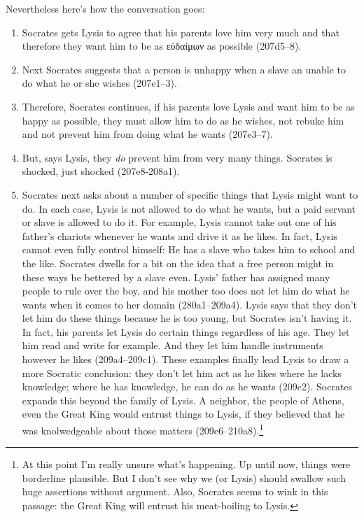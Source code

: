 \documentclass[11pt]{article}
\begin{document}
Nevertheless here's how the conversation goes:

\begin{enumerate}
    \item Socrates gets Lysis to agree that his parents love him very much and that therefore they want him to be as εὐδαίμων as possible (207d5--8).
    \item Next Socrates suggests that a person is unhappy when a slave an unable to do what he or she wishes (207e1--3).
    \item Therefore, Socrates continues, if his parents love Lysis and want him to be as happy as possible, they must allow him to do as he wishes, not rebuke him and not prevent him from doing what he wants (207e3--7).
    \item But, says Lysis, they \emph{do} prevent him from very many things.  Socrates is shocked, just shocked (207e8-208a1).
    \item Socrates next asks about a number of specific things that Lysis might want to do.  In each case, Lysis is not allowed to do what he wants, but a paid servant or slave is allowed to do it.  For example, Lysis cannot take out one of his father's chariots whenever he wants and drive it as he likes.  In fact, Lysis cannot even fully control himself: He has a slave who takes him to school and the like.  Socrates dwells for a bit on the idea that a free person might in these ways be bettered by a slave even.  Lysis' father has assigned many people to rule over the boy, and his mother too does not let him do what he wants when it comes to her domain (280a1--209a4).
        Lysis says that they don't let him do these things because he is too young, but Socrates isn't having it.  In fact, his parents let Lysis do certain things regardless of his age.  They let him read and write for example.  And they let him handle instruments however he likes (209a4--209c1).
        These examples finally lead Lysis to draw a more Socratic conclusion: they don't let him act as he likes where he lacks knowledge; where he has knowledge, he can do as he wants (209c2).
        Socrates expands this beyond the family of Lysis.  A neighbor, the people of Athens, even the Great King would entrust things to Lysis, if they believed that he was knolwedgeable about those matters (209c6--210a8).\footnote{At this point I'm really unsure what's happening.  Up until now, things were borderline plausible.  But I don't see why we (or Lysis) should swallow such huge assertions without argument.  Also, Socrates seems to wink in this passage: the Great King will entrust his meat-boiling to Lysis.}

\end{enumerate}
\end{document}
